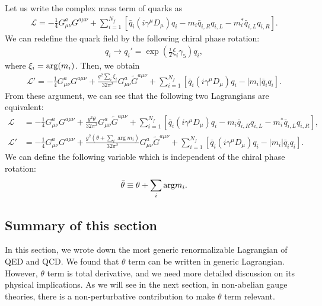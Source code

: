 \documentclass[11pt,a4paper]{article}
\begin{document}
Let us write the complex mass term of quarks as
\begin{align}
    \mathcal{L} = -\frac{1}{4} G_{\mu\nu}^a G^{a\mu\nu}
    + \sum_{i=1}^{N_f} [ \bar q_i (i\gamma^\mu D_\mu) q_i - m_i \bar q_{i,R} q_{i,L} - m_i^* \bar q_{i,L} q_{i,R} ].
\end{align}
We can redefine the quark field by the following chiral phase rotation:
\begin{align}
    q_i \to q_i' = \exp\left( \frac{i}{2} \xi_i \gamma_5 \right) q_i,
\end{align}
where $\xi_i = {\rm arg}(m_i)$. Then, we obtain
\begin{align}
    \mathcal{L}' = -\frac{1}{4} G_{\mu\nu}^a G^{a\mu\nu} + \frac{g^2 \sum_i \xi_i}{32\pi^2} G_{\mu\nu}^a \tilde G^{a\mu\nu}
    + \sum_{i=1}^{N_f} [ \bar q_i (i\gamma^\mu D_\mu) q_i - |m_i| \bar q_{i} q_{i} ].
\end{align}
From these argument, we can see that the following two Lagrangians are equivalent:
\begin{align}
    \mathcal{L} &= -\frac{1}{4} G_{\mu\nu}^a G^{a\mu\nu} + \frac{g^2 \theta}{32\pi^2} G_{\mu\nu}^a \tilde G^{a\mu\nu}
    + \sum_{i=1}^{N_f} [ \bar q_i (i\gamma^\mu D_\mu) q_i - m_i \bar q_{i,R} q_{i,L} - m_i^* \bar q_{i,L} q_{i,R} ], \\
    \mathcal{L}' &= -\frac{1}{4} G_{\mu\nu}^a G^{a\mu\nu} + \frac{g^2 (\theta + \sum_i \arg m_i)}{32\pi^2} G_{\mu\nu}^a \tilde G^{a\mu\nu}
    + \sum_{i=1}^{N_f} [ \bar q_i (i\gamma^\mu D_\mu) q_i - |m_i| \bar q_{i} q_{i} ].
\end{align}
We can define the following variable which is independent of the chiral phase rotation:
\begin{align}
    \bar\theta \equiv \theta + \sum_i {\rm arg} m_i.
\end{align}

\subsection{Summary of this section}
In this section, we wrote down the most generic renormalizable Lagrangian of QED and QCD. We found that $\theta$ term can be written in generic Lagrangian. However, $\theta$ term is total derivative, and we need more detailed discussion on its physical implications. 
As we will see in the next section, in non-abelian gauge theories, there is a non-perturbative contribution to make $\theta$ term relevant.
\end{document}
